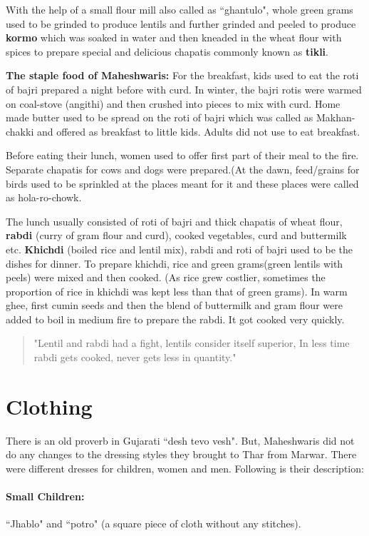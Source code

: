 With the help of a small flour mill also called as ``ghantulo", whole green grams used to be grinded to produce lentils and further grinded and peeled to produce \textbf{kormo} which was soaked in water and then kneaded in the wheat flour with spices to prepare special and delicious chapatis commonly known as \textbf{tikli}.

\textbf{The staple food of Maheshwaris:} For the breakfast, kids used to eat the roti of bajri prepared a night before with curd. In winter, the bajri rotis were warmed on coal-stove (angithi) and then crushed into pieces to mix with curd. Home made butter used to be spread on the roti of bajri which was called as Makhan-chakki and offered as breakfast to little kids. Adults did not use to eat breakfast.

Before eating their lunch, women used to offer first part of their meal to the fire. Separate chapatis for cows and dogs were prepared.(At the dawn, feed/grains for birds used to be sprinkled at the places meant for it and these places were called as hola-ro-chowk.

The lunch usually consisted of roti of bajri and thick chapatis of wheat flour, \textbf{rabdi} (curry of gram flour and curd), cooked vegetables, curd and buttermilk etc. \textbf{Khichdi} (boiled rice and lentil mix), rabdi and roti of bajri used to be the dishes for dinner. To prepare khichdi, rice and green grams(green lentils with peels) were mixed and then cooked. (As rice grew costlier, sometimes the proportion of rice in khichdi was kept less than that of green grams). In warm ghee, first cumin seeds and then the blend of buttermilk and gram flour were added to boil in medium fire to prepare the rabdi. It got cooked very quickly.
\begin{quotation}
"Lentil and rabdi had a fight, lentils consider itself superior,
In less time rabdi gets cooked, never gets less in quantity."
\end{quotation}

\section{Clothing}
There is an old proverb in Gujarati ``desh tevo vesh". But, Maheshwaris did not do any changes to the dressing styles they brought to Thar from Marwar. There were different dresses for children, women and men. Following is their description:

\paragraph{Small Children:} ``Jhablo" and ``potro" (a square piece of cloth without any stitches).
